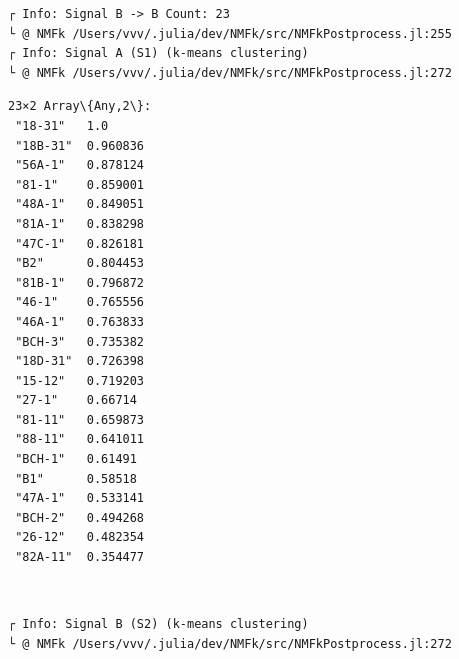 \documentclass[11pt]{article}
\begin{document}
    \begin{Verbatim}[commandchars=\\\{\}]
┌ Info: Signal B -> B Count: 23
└ @ NMFk /Users/vvv/.julia/dev/NMFk/src/NMFkPostprocess.jl:255
┌ Info: Signal A (S1) (k-means clustering)
└ @ NMFk /Users/vvv/.julia/dev/NMFk/src/NMFkPostprocess.jl:272
    \end{Verbatim}


    \begin{Verbatim}[commandchars=\\\{\}]
23×2 Array\{Any,2\}:
 "18-31"   1.0
 "18B-31"  0.960836
 "56A-1"   0.878124
 "81-1"    0.859001
 "48A-1"   0.849051
 "81A-1"   0.838298
 "47C-1"   0.826181
 "B2"      0.804453
 "81B-1"   0.796872
 "46-1"    0.765556
 "46A-1"   0.763833
 "BCH-3"   0.735382
 "18D-31"  0.726398
 "15-12"   0.719203
 "27-1"    0.66714
 "81-11"   0.659873
 "88-11"   0.641011
 "BCH-1"   0.61491
 "B1"      0.58518
 "47A-1"   0.533141
 "BCH-2"   0.494268
 "26-12"   0.482354
 "82A-11"  0.354477
    \end{Verbatim}


    \begin{center}
    \end{center}
    { \hspace*{\fill} \\}

    \begin{Verbatim}[commandchars=\\\{\}]
┌ Info: Signal B (S2) (k-means clustering)
└ @ NMFk /Users/vvv/.julia/dev/NMFk/src/NMFkPostprocess.jl:272
    \end{Verbatim}

    \begin{center}
    \end{center}
    { \hspace*{\fill} \\}

    \begin{Verbatim}[commandchars=\\\{\}]

    \end{Verbatim}

    \begin{center}
    \end{center}
    { \hspace*{\fill} \\}
\end{document}
